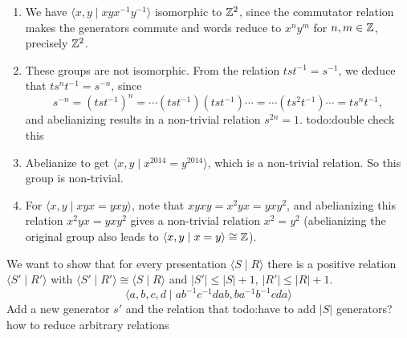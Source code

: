 \begin{ex}
    \begin{enumerate}[label=(\arabic*)]
    \setlength\itemsep{-.2em}
        \item We have $\langle x,y\mid  xyx^{-1}y^{-1}\rangle $ isomorphic to $\mathbb{Z}^2$, since the commutator relation makes the generators commute and words reduce to $x^n y^m$ for $n,m \in \mathbb{Z}$, precisely $\mathbb{Z}^2$.
        \item These groups are not isomorphic. From the relation $ts t^{-1}=s ^{-1}$, we deduce that $t s^n  t^{-1}=s ^{-n}$, since \[
                s ^{-n}=(tst ^{-1})^n = \cdots (tst ^{-1})(tst ^{-1}) \cdots = \cdots (t s ^2 t^{-1})\cdots =t s^n  t^{-1},
        \]  and abelianizing results in a non-trivial relation $s ^{2n}=1$. {\color{red}todo:double check this} 
        \item Abelianize to get $\langle x,y \mid x^{2014}=y ^{2014} \rangle $, which is a non-trivial relation. So this group is non-trivial.
        \item For $\langle x,y \mid xyx=yxy \rangle $, note that $xyxy=x^2yx=yxy^2$, and abelianizing this relation $x^2yx=yxy^2$ gives a non-trivial relation $x^2=y^2$ (abelianizing the original group also leads to $\langle x,y \mid x=y \rangle \cong \mathbb{Z}$).
    \end{enumerate}
\end{ex}
\begin{ex}
    We want to show that for every presentation $\langle S\mid R \rangle $ there is a positive relation $\langle S' \mid R' \rangle $ with $\langle S' \mid R' \rangle \cong  \langle S \mid R \rangle $ and $|S'| \leq |S|+1$, $|R'| \leq |R| +1$.
     \[
         \langle a,b,c,d \mid ab ^{-1} c ^{-1} d ab, b a^{-1} b ^{-1} cda \rangle 
     \] Add a new generator $s'$ and the relation that {\color{red}todo:have to add $|S|$ generators? how to reduce arbitrary relations} 
\end{ex}
